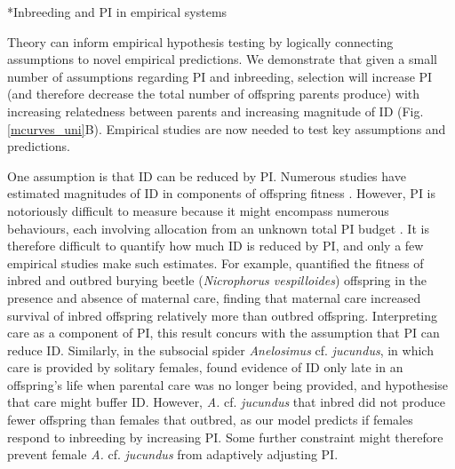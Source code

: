 \documentclass[12pt]{article}
\makeatletter
\renewcommand\subsection{\@startsection{subsection}{1}{-0.25in}{-0.5\baselineskip}{0.1\baselineskip}{\normalfont\normalsize\bfseries\textit}}
\makeatother
\begin{document}
\subsection*{Inbreeding and PI in empirical systems}

Theory can inform empirical hypothesis testing by logically connecting assumptions to novel empirical predictions. We demonstrate that given a small number of assumptions regarding PI and inbreeding, selection will increase PI (and therefore decrease the total number of offspring parents produce) with increasing relatedness between parents and increasing magnitude of ID (Fig. \ref{mcurves_uni}B). Empirical studies are now needed to test key assumptions and predictions.

One assumption is that ID can be reduced by PI. Numerous studies have estimated magnitudes of ID in components of offspring fitness \cite[][]{Charlesworth2009, Szulkin2012}. However, PI is notoriously difficult to measure because it might encompass numerous behaviours, each involving allocation from an unknown total PI budget \cite[][]{Parker2002}. It is therefore difficult to quantify how much ID is reduced by PI, and only a few empirical studies make such estimates. For example, \cite{Pilakouta2015} quantified the fitness of inbred and outbred burying beetle (\textit{Nicrophorus vespilloides}) offspring in the presence and absence of maternal care, finding that maternal care increased survival of inbred offspring relatively more than outbred offspring. Interpreting care as a component of PI, this result concurs with the assumption that PI can reduce ID. Similarly, in the subsocial spider \textit{Anelosimus} cf. \textit{jucundus}, in which care is provided by solitary females, \cite{Aviles2006} found evidence of ID only late in an offspring's life when parental care was no longer being provided, and hypothesise that care might buffer ID. However, \textit{A.} cf. \textit{jucundus} that inbred did not produce fewer offspring than females that outbred, as our model predicts if females respond to inbreeding by increasing PI. Some further constraint might therefore prevent female \textit{A.} cf. \textit{jucundus} from adaptively adjusting PI.
\end{document}
